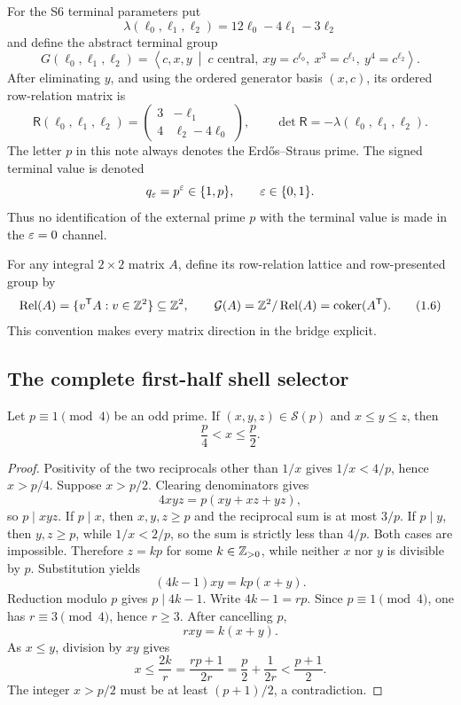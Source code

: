 For the S6 terminal parameters put
\begin{equation}
 \lambda(\ell_0,\ell_1,\ell_2)
 =12\ell_0-4\ell_1-3\ell_2                 \tag{1.3}
\end{equation}
and define the abstract terminal group
\begin{equation}
 G(\ell_0,\ell_1,\ell_2)=
 \left\langle c,x,y\ \middle|\
 c\text{ central},\ xy=c^{\ell_0},\
 x^3=c^{\ell_1},\ y^4=c^{\ell_2}
 \right\rangle .                            \tag{1.4}
\end{equation}
After eliminating \(y\), and using the ordered generator basis \((x,c)\),
its ordered row-relation matrix is
\begin{equation}
 \mathsf R(\ell_0,\ell_1,\ell_2)=
 \begin{pmatrix}
 3&-\ell_1\\
 4&\ell_2-4\ell_0
 \end{pmatrix},
 \qquad
 \det\mathsf R=-\lambda(\ell_0,\ell_1,\ell_2).              \tag{1.5}
\end{equation}
The letter \(p\) in this note always denotes the Erd\H{o}s--Straus prime.
The signed terminal value is denoted
\[
 q_\varepsilon=p^\varepsilon\in\{1,p\},\qquad \varepsilon\in\{0,1\}.
\]
Thus no identification of the external prime \(p\) with the terminal value
is made in the \(\varepsilon=0\) channel.

For any integral \(2\times2\) matrix \(A\), define its row-relation lattice
and row-presented group by
\[
 \operatorname{Rel}(A)=\{v^{\mathsf T}A:v\in\mathbb Z^2\}\subseteq\mathbb Z^2,
 \qquad \mathcal G(A)=\mathbb Z^2/\operatorname{Rel}(A)=\operatorname{coker}(A^{\mathsf T}).    \tag{1.6}
\]
This convention makes every matrix direction in the bridge explicit.

\subsection{The complete first-half shell selector}

\begin{lemma}\label{lem:esksb-first-half}
Let \(p\equiv1\pmod4\) be an odd prime.  If
\((x,y,z)\in\mathscr S(p)\) and \(x\leq y\leq z\), then
\[
 \frac p4<x\leq\frac p2.
\]
\end{lemma}

\begin{proof}
Positivity of the two reciprocals other than \(1/x\) gives
\(1/x<4/p\), hence \(x>p/4\).  Suppose \(x>p/2\).  Clearing denominators
gives
\[
 4xyz=p(xy+xz+yz),
\]
so \(p\mid xyz\).  If \(p\mid x\), then \(x,y,z\geq p\) and the reciprocal
sum is at most \(3/p\).  If \(p\mid y\), then \(y,z\geq p\), while
\(1/x<2/p\), so the sum is strictly less than \(4/p\).  Both cases are
impossible.  Therefore \(z=kp\) for some \(k\in\mathbb Z_{>0}\), while neither
\(x\) nor \(y\) is divisible by \(p\).  Substitution yields
\[
 (4k-1)xy=kp(x+y).
\]
Reduction modulo \(p\) gives \(p\mid4k-1\).  Write \(4k-1=rp\).
Since \(p\equiv1\pmod4\), one has \(r\equiv3\pmod4\), hence \(r\geq3\).
After cancelling \(p\),
\[
 rxy=k(x+y).
\]
As \(x\leq y\), division by \(xy\) gives
\[
 x\leq\frac{2k}{r}
 =\frac{rp+1}{2r}
 =\frac p2+\frac1{2r}<\frac{p+1}{2}.
\]
The integer \(x>p/2\) must be at least \((p+1)/2\), a contradiction.
\end{proof}

